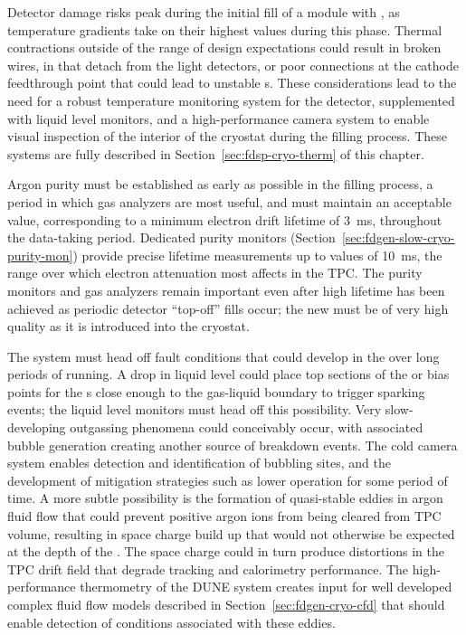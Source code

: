 Detector damage risks peak during the initial fill of a module with \lar, as temperature gradients take on their highest values during this phase.  Thermal contractions outside of the range of design expectations could result in broken  wires,  in  that detach from the  light detectors, or poor connections at the cathode  feedthrough point that could lead to unstable \efield{}s.  These considerations lead to the need for %
a robust temperature monitoring system for the detector, supplemented with liquid level monitors, and a high-performance camera system to enable visual inspection of the interior of the cryostat %
during the filling process.  These systems are fully described in Section~\ref{sec:fdsp-cryo-therm} of this chapter.
 
Argon purity must be established as early as possible in the filling process, a period in which gas analyzers are most useful, and must maintain an acceptable value, corresponding to a minimum electron drift lifetime of \SI{3}{ms}, throughout the data-taking period.  Dedicated  purity monitors (Section~\ref{sec:fdgen-slow-cryo-purity-mon}) 
provide precise lifetime measurements up to values of \SI{10}{ms}, the range over which electron attenuation most affects  in the TPC.  The purity monitors and gas analyzers remain important even after high lifetime has been achieved as periodic detector ``top-off''  fills occur; the new \lar must be of very high quality as it is introduced into the cryostat.
 
The  system must head off fault conditions that could develop in the  over long periods of running.  A drop in liquid level could place top sections of the  or bias  points  for the s close enough to the gas-liquid boundary to trigger sparking events; the liquid level monitors must head off this possibility.  Very slow-developing outgassing phenomena could conceivably occur, with associated bubble generation creating another source of  breakdown events.  The cold camera system enables detection and identification of bubbling sites, and the development of mitigation strategies such as lower  operation for some period of time.  A more subtle possibility is the formation of quasi-stable eddies in argon fluid flow that could prevent positive argon ions from being cleared from TPC volume, resulting in space charge build up that would not otherwise be expected at the depth of the .  The space charge could in turn produce distortions in the TPC drift field that degrade tracking and calorimetry performance.  The high-performance thermometry  of the DUNE  system creates input for well developed complex fluid flow models described in Section~\ref{sec:fdgen-cryo-cfd} that should enable detection of  conditions associated with these eddies.
 
